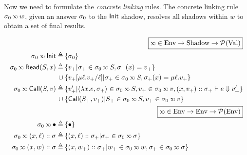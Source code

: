 Now we need to formulate the \emph{concrete linking} rules.
The concrete linking rule $\ctx_0\semlink w$, given an answer $\sigma_0$ to the $\mathsf{Init}$ shadow, resolves all shadows within $w$ to obtain a set of final results.

\begin{align*}
                                                         & \pushright{\fbox{$\semlink\in\Ctx\rightarrow\Event\rightarrow\pset{\Value}$}}                                                          \\
  \ctx_0\semlink\InitE\triangleq                         & \: \{\ctx_0\}                                                                                                                          \\
  \ctx_0\semlink\ReadE(\event,x)\triangleq               & \: \{v_+|\ctx_+\in\ctx_0\semlink\event,\ctx_+(x)=v_+\}                                                                                 \\
  \cup                                                   & \: \{v_+[\mu\ell.v_+/\ell]|\ctx_+\in\ctx_0\semlink\event,\ctx_+(x)=\mu\ell.v_+\}                                                       \\
  \ctx_0\semlink\CallE(\event,v)\triangleq               & \: \{v_+'|\langle\lambda x.e,\ctx_+\rangle\in\ctx_0\semlink\event, v_+\in\ctx_0\semlink v, (x,v_+)\cons\ctx_+\vdash e\Downarrow v_+'\} \\
  \cup                                                   & \: \{\CallE(\event_+,v_+)|\event_+\in\ctx_0\semlink\event, v_+\in\ctx_0\semlink v\}                                                    \\
                                                         & \pushright{\fbox{$\semlink\in\Ctx\rightarrow\Ctx\rightarrow\pset{\Ctx}$}}                                                              \\
  \ctx_0\semlink\bullet\triangleq                        & \: \{\bullet\}                                                                                                                         \\
  \ctx_0\semlink(x,\ell)\cons\ctx\triangleq              & \: \{(x,\ell)\cons\ctx_+|\ctx_+\in\ctx_0\semlink\ctx\}                                                                                 \\
  \ctx_0\semlink(x,w)\cons\ctx\triangleq                 & \: \{(x,w_+)\cons\ctx_+|w_+\in\ctx_0\semlink w,\ctx_+\in\ctx_0\semlink\ctx\}                                                           \\

\end{align*}
